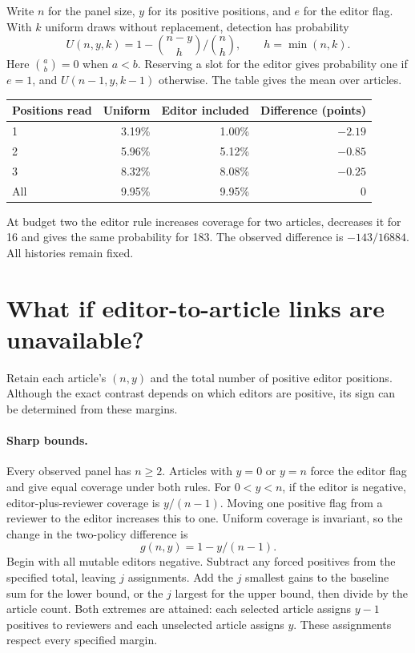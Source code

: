 \documentclass[11pt]{article}
\begin{document}
Write $n$ for the panel size, $y$ for its positive positions, and $e$ for the editor flag. With $k$ uniform draws without replacement, detection has probability
\[
 U(n,y,k)=1-\binom{n-y}{h}/\binom{n}{h},\qquad h=\min(n,k).
\]
Here $\binom{a}{b}=0$ when $a<b$. Reserving a slot for the editor gives probability one if $e=1$, and $U(n-1,y,k-1)$ otherwise. The table gives the mean over articles.
\begin{center}\small
\begin{tabular}{lrrr}
\toprule Positions read & Uniform & Editor included & Difference (points)\\\midrule
1 & 3.19\% & 1.00\% & $-2.19$\\
2 & 5.96\% & 5.12\% & $-0.85$\\
3 & 8.32\% & 8.08\% & $-0.25$\\
All & 9.95\% & 9.95\% & $0$\\\bottomrule
\end{tabular}
\end{center}
At budget two the editor rule increases coverage for two articles, decreases it for 16 and gives the same probability for 183. The observed difference is $-143/16884$. All histories remain fixed.
\newpage
\section{What if editor-to-article links are unavailable?}
Retain each article's $(n,y)$ and the total number of positive editor positions. Although the exact contrast depends on which editors are positive, its sign can be determined from these margins.

\paragraph{Sharp bounds.} Every observed panel has $n\ge2$. Articles with $y=0$ or $y=n$ force the editor flag and give equal coverage under both rules. For $0<y<n$, if the editor is negative, editor-plus-reviewer coverage is $y/(n-1)$. Moving one positive flag from a reviewer to the editor increases this to one. Uniform coverage is invariant, so the change in the two-policy difference is
\[
 g(n,y)=1-y/(n-1).
\]
Begin with all mutable editors negative. Subtract any forced positives from the specified total, leaving $j$ assignments. Add the $j$ smallest gains to the baseline sum for the lower bound, or the $j$ largest for the upper bound, then divide by the article count. Both extremes are attained: each selected article assigns $y-1$ positives to reviewers and each unselected article assigns $y$. These assignments respect every specified margin.
\end{document}
